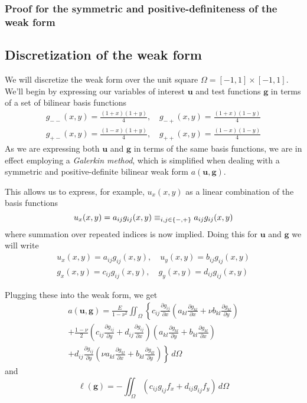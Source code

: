 \documentclass[11pt]{article}
\let\sumop\relax
\newcommand\p[2]{\frac{\partial #1}{\partial #2}}
\begin{document}
\subsubsection*{Proof for the symmetric and positive-definiteness of the weak form}

\subsection{Discretization of the weak form}
We will discretize the weak form over the unit square $\Omega = [-1,1]\times[-1,1]$. We'll begin by expressing our variables of interest $\bm{u}$ and test functions $\bm{g}$ in terms of a set of bilinear basis functions
\begin{gather}
g_{--}(x,y) = \frac{(1+x)(1+y)}{4}, \quad g_{-+}(x,y) = \frac{(1+x)(1-y)}{4}\\
g_{+-}(x,y) = \frac{(1-x)(1+y)}{4}, \quad g_{++}(x,y) = \frac{(1-x)(1-y)}{4}
\end{gather}
As we are expressing both $\bm{u}$ and $\bm{g}$ in terms of the same basis functions, we are in effect employing a \emph{Galerkin method}, which is simplified when dealing with a symmetric and positive-definite bilinear weak form $a(\bm{u,g})$.

This allows us to express, for example, $u_x(x,y)$ as a linear combination of the basis functions
\begin{equation}
  u_x(x,y) = a_{ij}g_{ij}(x,y) \equiv \sumop_{i,j \in \{-,+\}} a_{ij}g_{ij}(x,y)
\end{equation}
where summation over repeated indices is now implied. Doing this for $\bm{u}$ and $\bm{g}$ we will write
\begin{equation}
\begin{gathered}
  u_x(x,y) = a_{ij}g_{ij}(x,y), \quad u_y(x,y) = b_{ij}g_{ij}(x,y) \\
  g_x(x,y) = c_{ij}g_{ij}(x,y), \quad g_y(x,y) = d_{ij}g_{ij}(x,y)
\end{gathered}
\end{equation}

Plugging these into the weak form, we get
\begin{multline}
  a(\bm{u},\bm{g}) = \frac{E}{1-\nu^2} \iint_\Omega \left\{
    c_{ij}\p{g_{ij}}{x} \left(
      a_{kl}\p{g_{kl}}{x}
      + \nu b_{kl}\p{g_{kl}}{y}
    \right) \right. \\ \left.
  + \frac{1-\nu}{2} \left(
    c_{ij}\p{g_{ij}}{y}
    + d_{ij}\p{g_{ij}}{x}
  \right)
  \left(
    a_{kl}\p{g_{kl}}{y}
     + b_{kl}\p{g_{kl}}{x}
   \right) \right. \\ \left.
  + d_{ij}\p{g_{ij}}{y} \left(
    \nu a_{kl}\p{g_{kl}}{x}
    + b_{kl}\p{g_{kl}}{y}
  \right)
\right\} \, d\Omega
\end{multline}
and
\begin{equation}
  \ell(\bm{g}) = -\iint_\Omega \left( c_{ij}g_{ij}f_x + d_{ij}g_{ij} f_y \right) \, d\Omega
\end{equation}
\end{document}
